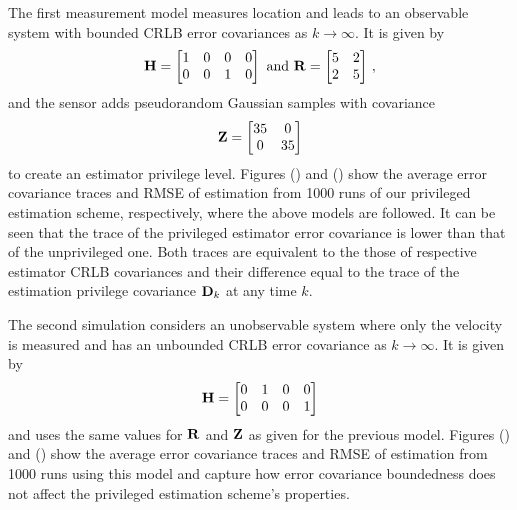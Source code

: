 \documentclass[letterpaper, 10 pt, conference]{IEEEtran}
\theoremstyle{definition}
\theoremstyle{definition}
\theoremstyle{remark}
\begin{document}
The first measurement model measures location and leads to an observable system with bounded CRLB error covariances as $k \rightarrow \infty$. It is given by
\begin{equation*}
   {\ensuremath{{\mathbf{H}}}}=
   \begin{bmatrix}
      1 & 0 & 0 & 0\\
      0 & 0 & 1 & 0
   \end{bmatrix}
   \text{ and }
   {\ensuremath{{\mathbf{R}}}}=
   \begin{bmatrix}
      5 & 2\\
      2 & 5
   \end{bmatrix}\,,
\end{equation*}
and the sensor adds pseudorandom Gaussian samples with covariance
\begin{equation*}
   {\ensuremath{{\mathbf{Z}}}}=
   \begin{bmatrix}
      35 & 0\\
      0 & 35
   \end{bmatrix}
\end{equation*}
to create an estimator privilege level. Figures () and () show the average error covariance traces and RMSE of estimation from 1000 runs of our privileged estimation scheme, respectively, where the above models are followed. It can be seen that the trace of the privileged estimator error covariance is lower than that of the unprivileged one. Both traces are equivalent to the those of respective estimator CRLB covariances and their difference equal to the trace of the estimation privilege covariance ${{\mathbf{D}}}_k$ at any time $k$.


The second simulation considers an unobservable system where only the velocity is measured and has an unbounded CRLB error covariance as $k \rightarrow \infty$. It is given by
\begin{equation*}
   {\ensuremath{{\mathbf{H}}}}=
   \begin{bmatrix}
      0 & 1 & 0 & 0\\
      0 & 0 & 0 & 1
   \end{bmatrix}
\end{equation*}
and uses the same values for ${{\mathbf{R}}}$ and ${{\mathbf{Z}}}$ as given for the previous model. Figures () and () show the average error covariance traces and RMSE of estimation from 1000 runs using this model and capture how error covariance boundedness does not affect the privileged estimation scheme's properties.

\end{document}
